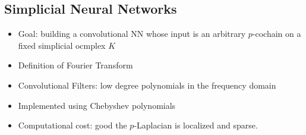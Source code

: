 \subsection{Simplicial Neural Networks}
\begin{itemize}
\item Goal: building a convolutional NN whose input is an arbitrary $p$-cochain on a fixed simplicial ocmplex $K$
\item  Definition of Fourier Transform
\item Convolutional Filters: low degree polynomials in the frequency domain
\item Implemented using Chebyshev polynomials
\item Computational cost: good the $p$-Laplacian is localized and sparse.
\end{itemize}

